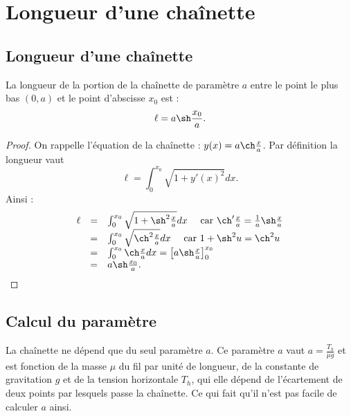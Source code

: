 \documentclass[class=report,crop=false]{standalone}
\begin{document}
\section{Longueur d'une chaînette}


\subsection{Longueur d'une chaînette}

\begin{proposition}
\label{prop:long}
La longueur de la portion de la chaînette de paramètre $a$ entre le point le plus 
bas $(0,a)$ et le point d'abscisse $x_0$ est :
$$\ell = a \sh \frac{x_0}{a}.$$
\end{proposition}
\shorthandoff{:}
\shorthandon{:}

\begin{proof}
On rappelle l'équation de la chaînette : $y(x) =a \ch \frac x a$.
Par définition la longueur vaut
$$\ell = \int_0^{x_0} \sqrt{1+y'(x)^2} dx.$$
Ainsi :
$$\begin{array}{rcl}
 \ell 
   &=& \int_0^{x_0} \sqrt{1+\sh^2 \tfrac x a} dx \quad \text{ car } \ch' \tfrac x a = \frac 1 a \sh \tfrac x a \\
   &=& \int_0^{x_0} \sqrt{\ch^2 \tfrac x a} dx   \quad \text{ car } 1+\sh^2 u = \ch^2 u \\
   &=& \int_0^{x_0} \ch \tfrac x a dx =  \left[ a \sh \tfrac x a \right]_0^{x_0} \\
   &=& a \sh \tfrac{x_0}{a}. \\
\end{array}$$

\end{proof}


\subsection{Calcul du paramètre}

La chaînette ne dépend que du seul paramètre $a$.
Ce paramètre $a$ vaut $a = \frac{T_h}{\mu g}$ et est fonction de la masse $\mu$  
du fil par unité de longueur, de la constante de gravitation $g$ et 
de la tension horizontale $T_h$, qui elle dépend de l'écartement
de deux points par lesquels passe la chaînette.
Ce qui fait qu'il n'est pas facile de calculer $a$ ainsi.
\end{document}
